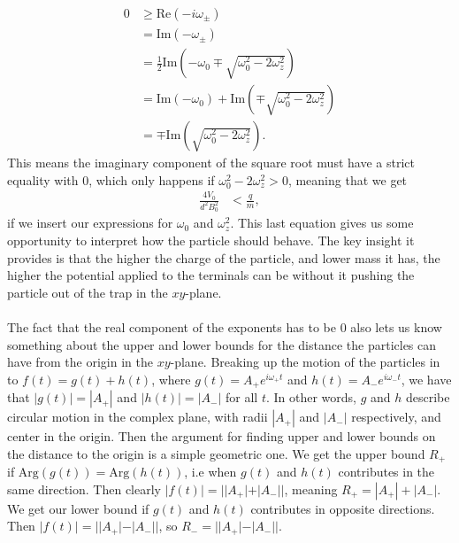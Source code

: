 %
\begin{align*}
0 &\geq \text{Re} \left(-i \omega_\pm \right) \\
  &= \text{Im} \left(- \omega_\pm \right) \\
  &= \frac{1}{2} \text{Im} \left(- \omega_0 \mp \sqrt{\omega_0^2 - 2 \omega_z^2} \right) \\
  &= \text{Im} \left(- \omega_0 \right) + \text{Im} \left( \mp \sqrt{\omega_0^2 - 2 \omega_z^2} \right) \\
  &= \mp \text{Im} \left( \sqrt{\omega_0^2 - 2 \omega_z^2} \right).
\end{align*}
%
This means the imaginary component of the square root must have a strict equality with $0$, which only happens if $\omega_0^2 - 2 \omega_z^2 > 0$, meaning that we get
%
\begin{align*}
\frac{4V_0}{d^2 B_0^2} &< \frac{q}{m},
\end{align*}
%
if we insert our expressions for $\omega_0$ and $\omega_z^2$. This last equation gives us some opportunity to interpret how the particle should behave. The key insight it provides is that the higher the charge of the particle, and lower mass it has, the higher the potential applied to the terminals can be without it pushing the particle out of the trap in the $xy$-plane.
\\\\
The fact that the real component of the exponents has to be $0$ also lets us know something about the upper and lower bounds for the distance the particles can have from the origin in the $xy$-plane. Breaking up the motion of the particles in to $f(t) = g(t) + h(t)$, where $g(t) = A_+e^{i\omega_+ t}$ and $h(t) = A_-e^{i\omega_- t}$, we have that $|g(t)| = |A_+|$ and $|h(t)| = |A_-|$ for all $t$. In other words, $g$ and $h$ describe circular motion in the complex plane, with radii $|A_+|$ and $|A_-|$ respectively, and center in the origin. Then the argument for finding upper and lower bounds on the distance to the origin is a simple geometric one. We get the upper bound $R_+$ if $\text{Arg}(g(t)) = \text{Arg}(h(t))$, i.e when $g(t)$ and $h(t)$ contributes in the same direction. Then clearly $|f(t)| = ||A_+| + |A_-||$, meaning $R_+ = |A_+| + |A_-|$. We get our lower bound if $g(t)$ and $h(t)$ contributes in opposite directions. Then $|f(t)| = ||A_+| - |A_-||$, so $R_- = ||A_+| - |A_-||$. %

